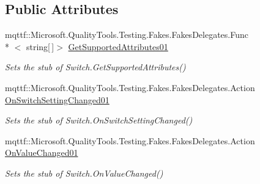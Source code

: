 \subsection*{Public Attributes}
\begin{DoxyCompactItemize}
\item 
mqttf\-::\-Microsoft.\-Quality\-Tools.\-Testing.\-Fakes.\-Fakes\-Delegates.\-Func\\*
$<$ string\mbox{[}$\,$\mbox{]}$>$ \hyperlink{class_system_1_1_diagnostics_1_1_fakes_1_1_stub_switch_ab14c0f7d4ee433f27bfa605479fc1664}{Get\-Supported\-Attributes01}
\begin{DoxyCompactList}\small\item\em Sets the stub of Switch.\-Get\-Supported\-Attributes()\end{DoxyCompactList}\item 
mqttf\-::\-Microsoft.\-Quality\-Tools.\-Testing.\-Fakes.\-Fakes\-Delegates.\-Action \hyperlink{class_system_1_1_diagnostics_1_1_fakes_1_1_stub_switch_adb3cc8187966144876188ae4b5669c2e}{On\-Switch\-Setting\-Changed01}
\begin{DoxyCompactList}\small\item\em Sets the stub of Switch.\-On\-Switch\-Setting\-Changed()\end{DoxyCompactList}\item 
mqttf\-::\-Microsoft.\-Quality\-Tools.\-Testing.\-Fakes.\-Fakes\-Delegates.\-Action \hyperlink{class_system_1_1_diagnostics_1_1_fakes_1_1_stub_switch_a8e0f676b9ba229d3b9f7a9a4e1e5d8e7}{On\-Value\-Changed01}
\begin{DoxyCompactList}\small\item\em Sets the stub of Switch.\-On\-Value\-Changed()\end{DoxyCompactList}\end{DoxyCompactItemize}
